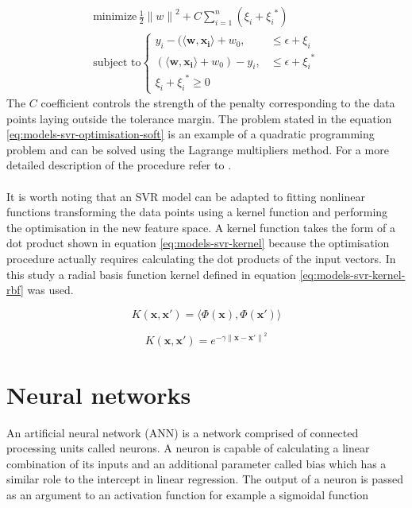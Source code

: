 \begin{equation}\label{eq:models-svr-optimisation-soft}
\begin{gathered}
    \text{minimize}\, \frac{1}{2} {\lVert {w} \rVert}^2 + C\sum_{i = 1}^{n} ({\xi}_i + {{\xi}_i}^*) \\
    \text{subject to}
    \begin{cases}
        y_i - (\langle \bm{w}, \bm{x_i} \rangle + w_0, & \leq \epsilon + {\xi}_i \\
        (\langle \bm{w}, \bm{x_i} \rangle + w_0) - y_i, & \leq \epsilon + {{\xi}_i}^* \\
        {\xi}_i + {{\xi}_i}^* \geq 0
    \end{cases}
\end{gathered}
\end{equation}
The $C$ coefficient controls the strength of the penalty corresponding to the data points laying outside the tolerance margin. The problem stated in the equation \ref{eq:models-svr-optimisation-soft} is an example of a quadratic programming problem and can be solved using the Lagrange multipliers method. For a more detailed description of the procedure refer to \cite{SMOLA2003}.
\\\\
It is worth noting that an SVR model can be adapted to fitting nonlinear functions transforming the data points using a kernel function and performing the optimisation in the new feature space. A kernel function takes the form of a dot product shown in equation \ref{eq:models-svr-kernel} because the optimisation procedure actually requires calculating the dot products of the input vectors. In this study a radial basis function kernel defined in equation \ref{eq:models-svr-kernel-rbf} was used.

\begin{equation}\label{eq:models-svr-kernel}
K(\bm{x}, \bm{x'}) = \langle \Phi(\bm{x}), \Phi(\bm{x'}) \rangle
\end{equation}

\begin{equation}\label{eq:models-svr-kernel-rbf}
K(\bm{x}, \bm{x'}) = e^{-\gamma {\lVert \bm{x} - \bm{x'} \rVert}^2}
\end{equation}

\section{Neural networks}
An artificial neural network (ANN) is a network comprised of connected processing units called neurons. A neuron is capable of calculating a linear combination of its inputs and an additional parameter called bias which has a similar role to the intercept in linear regression. The output of a neuron is passed as an argument to an activation function for example a sigmoidal function

